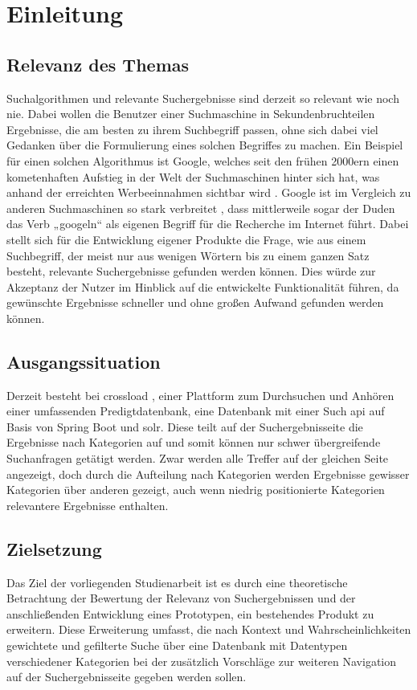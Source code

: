 \chapter{Einleitung}\label{ch:intro}

\section{Relevanz des Themas}
Suchalgorithmen und relevante Suchergebnisse sind derzeit so relevant wie noch nie. Dabei wollen die Benutzer einer Suchmaschine in Sekundenbruchteilen Ergebnisse, die am besten zu ihrem Suchbegriff passen, ohne sich dabei viel Gedanken über die Formulierung eines solchen Begriffes zu machen. Ein Beispiel für einen solchen Algorithmus ist Google, welches seit den frühen 2000ern einen kometenhaften Aufstieg in der Welt der Suchmaschinen hinter sich hat, was anhand der erreichten Werbeeinnahmen sichtbar wird \cite{googleUmsatz}. Google ist im Vergleich zu anderen Suchmaschinen so stark verbreitet \cite{googleShare}, dass mittlerweile sogar der Duden das Verb „googeln“ als eigenen Begriff für die Recherche im Internet führt.\cite{dudenGooglen}
Dabei stellt sich für die Entwicklung eigener Produkte die Frage, wie aus einem Suchbegriff, der meist nur aus wenigen Wörtern bis zu einem ganzen Satz besteht, relevante Suchergebnisse gefunden werden können. Dies würde zur Akzeptanz der Nutzer im Hinblick auf die entwickelte Funktionalität führen, da gewünschte Ergebnisse schneller und ohne großen Aufwand gefunden werden können.

\section{Ausgangssituation}
Derzeit besteht bei \gls{crossload} \cite{crossload}, einer Plattform zum Durchsuchen und Anhören einer umfassenden Predigtdatenbank, eine Datenbank mit einer Such \gls{api} auf Basis von Spring Boot und \gls{solr}. Diese teilt auf der Suchergebnisseite die Ergebnisse nach Kategorien auf und somit können nur schwer übergreifende Suchanfragen getätigt werden. Zwar werden alle Treffer auf der gleichen Seite angezeigt, doch durch die Aufteilung nach Kategorien werden Ergebnisse gewisser Kategorien über anderen gezeigt, auch wenn niedrig positionierte Kategorien relevantere Ergebnisse enthalten.

\section{Zielsetzung}
Das Ziel der vorliegenden Studienarbeit ist es durch eine theoretische Betrachtung der Bewertung der Relevanz von Suchergebnissen und der anschließenden Entwicklung eines Prototypen, ein bestehendes Produkt zu erweitern. Diese Erweiterung umfasst, die nach Kontext und Wahrscheinlichkeiten gewichtete und gefilterte Suche über eine Datenbank mit Datentypen verschiedener Kategorien bei der zusätzlich Vorschläge zur weiteren Navigation auf der Suchergebnisseite gegeben werden sollen.
